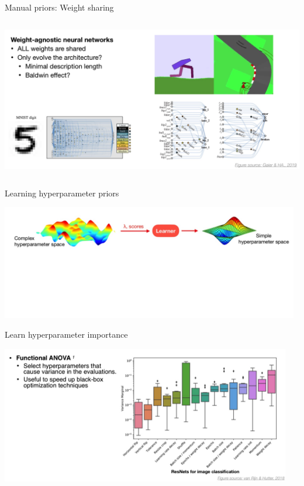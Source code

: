 \documentclass[aspectratio=169,t,handout,xcolor={usenames,dvipsnames}]{beamer}
\begin{document}
\begin{frame}{Manual priors: Weight sharing}

\centering\includegraphics[height=7cm]{image/Jietu20220328-200845.jpg}


\end{frame}
\begin{frame}{Learning hyperparameter priors}

\centering\includegraphics[height=5cm]{image/Jietu20220328-200954.jpg}


\end{frame}
\begin{frame}{Learn hyperparameter importance}

\centering\includegraphics[height=6cm]{image/Jietu20220328-201111.jpg}


\end{frame}
\end{document}
